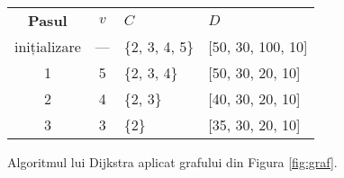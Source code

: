 \documentclass[9pt,a4paper]{article}
\renewcommand\figurename{Figura}
\begin{document}
\begin{figure}[htbp]
    \renewcommand\figurename{Tabelul}
    \setcounter{figure}{0}
    \centering
    \begin{tabular}{ccll}
        \textbf{Pasul} & $v$ & $C$            & $D$               \\
        inițializare   & --- & \{2, 3, 4, 5\} & [50, 30, 100, 10] \\
        1              & 5   & \{2, 3, 4\}    & [50, 30, 20, 10]  \\
        2              & 4   & \{2, 3\}       & [40, 30, 20, 10]  \\
        3              & 3   & \{2\}          & [35, 30, 20, 10]
    \end{tabular}
    \caption{Algoritmul lui Dijkstra aplicat grafului din Figura \ref{fig:graf}.}
    \label{tbl:algoritm}
\end{figure}
\end{document}
